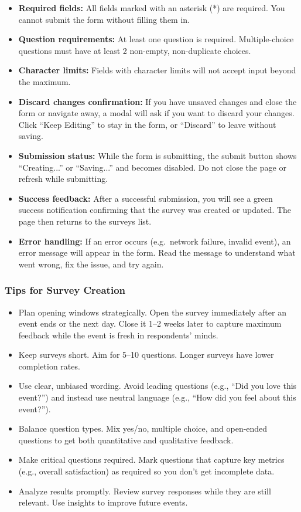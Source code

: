 \documentclass[12pt, a4paper]{article}
\begin{document}
\begin{itemize}
  \item \textbf{Required fields:} All fields marked with an asterisk (*) are required. You cannot submit the form without filling them in.
  \item \textbf{Question requirements:} At least one question is required. Multiple-choice questions must have at least 2 non-empty, non-duplicate choices.
  \item \textbf{Character limits:} Fields with character limits will not accept input beyond the maximum.
  \item \textbf{Discard changes confirmation:} If you have unsaved changes and close the form or navigate away, a modal will ask if you want to discard your changes. Click ``Keep Editing'' to stay in the form, or ``Discard'' to leave without saving.
  \item \textbf{Submission status:} While the form is submitting, the submit button shows ``Creating...'' or ``Saving...'' and becomes disabled. Do not close the page or refresh while submitting.
  \item \textbf{Success feedback:} After a successful submission, you will see a green success notification confirming that the survey was created or updated. The page then returns to the surveys list.
  \item \textbf{Error handling:} If an error occurs (e.g.\ network failure, invalid event), an error message will appear in the form. Read the message to understand what went wrong, fix the issue, and try again.
\end{itemize}

\subsubsection{Tips for Survey Creation}

\begin{itemize}[leftmargin=1.5em]
  \item Plan opening windows strategically. Open the survey immediately after an event ends or the next day. Close it 1–2 weeks later to capture maximum feedback while the event is fresh in respondents' minds.
  \item Keep surveys short. Aim for 5–10 questions. Longer surveys have lower completion rates.
  \item Use clear, unbiased wording. Avoid leading questions (e.g., ``Did you love this event?'') and instead use neutral language (e.g., ``How did you feel about this event?'').
  \item Balance question types. Mix yes/no, multiple choice, and open-ended questions to get both quantitative and qualitative feedback.
  \item Make critical questions required. Mark questions that capture key metrics (e.g., overall satisfaction) as required so you don't get incomplete data.
  \item Analyze results promptly. Review survey responses while they are still relevant. Use insights to improve future events.
\end{itemize}
\end{document}
